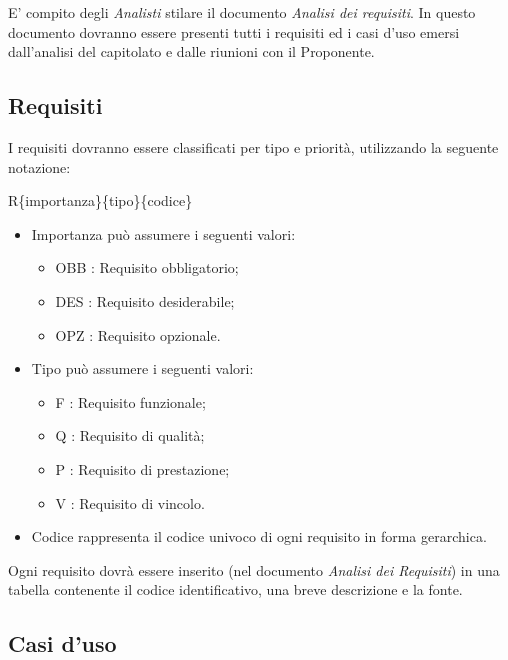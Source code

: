 E' compito degli \textit{Analisti} stilare il documento \textit{Analisi dei requisiti}.
In questo documento dovranno essere presenti tutti i requisiti ed i casi d'uso emersi dall'analisi del capitolato e dalle riunioni con il Proponente.\\

\subsection{Requisiti}

I requisiti dovranno essere classificati per tipo e priorità, utilizzando la seguente notazione:

R\{importanza\}\{tipo\}\{codice\}
\begin{itemize}
  \item Importanza può assumere i seguenti valori:
\begin{itemize}
	\item {OBB} : Requisito obbligatorio;
	\item {DES} : Requisito desiderabile;
	\item {OPZ} : Requisito opzionale.
\end{itemize}
  \item Tipo può assumere i seguenti valori:
\begin{itemize}
	\item {F} : Requisito funzionale;
	\item {Q} : Requisito di qualità;
	\item {P} : Requisito di prestazione;
	\item {V} : Requisito di vincolo.
\end{itemize}
  \item Codice rappresenta il codice univoco di ogni requisito in forma gerarchica.
\end{itemize}
Ogni requisito dovrà essere inserito (nel documento \textit{Analisi dei Requisiti}) in una tabella contenente il codice identificativo, una breve descrizione e la fonte.

\subsection{Casi d'uso}

